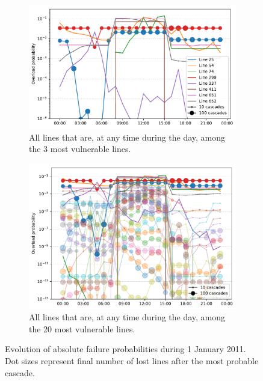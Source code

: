 \documentclass[main.tex]{subfiles}
\begin{document}
\begin{figure}[ht]
\begin{subfigure}{\textwidth}
    \centering
    \includegraphics[width=\textwidth]{img/evolution_overload_probs_3.pdf}
    \caption{All lines that are, at any time during the day, among the 3 most vulnerable lines.}\label{fig:evolution_vulnerabilities_3}
\end{subfigure}
\begin{subfigure}{\textwidth}
    \centering
    \includegraphics[width=\textwidth]{img/evolution_overload_probs_3_20.pdf}
    \caption{All lines that are, at any time during the day, among the 20 most vulnerable lines.}\label{fig:evolution_vulnerabilities_3_20}
\end{subfigure}
    \caption{\label{fig:evolution_vulnerabilities}Evolution of absolute failure probabilities during 1 January 2011. Dot sizes represent final number of lost lines after the most probable cascade.}
\end{figure}
\end{document}
